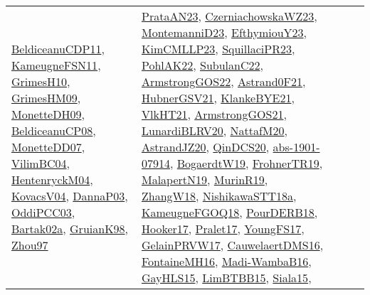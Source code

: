 {\begin{longtable}{lp{3cm}>{\raggedright}p{6cm}>{\raggedright}p{6cm}p{8cm}}
\href{articles/BeldiceanuCDP11.pdf}{BeldiceanuCDP11}\cite{BeldiceanuCDP11}, \href{papers/KameugneFSN11.pdf}{KameugneFSN11}\cite{KameugneFSN11}, \href{papers/GrimesH10.pdf}{GrimesH10}\cite{GrimesH10}, \href{papers/GrimesHM09.pdf}{GrimesHM09}\cite{GrimesHM09}, \href{papers/MonetteDH09.pdf}{MonetteDH09}\cite{MonetteDH09}, \href{papers/BeldiceanuCP08.pdf}{BeldiceanuCP08}\cite{BeldiceanuCP08}, \href{papers/MonetteDD07.pdf}{MonetteDD07}\cite{MonetteDD07}, \href{papers/VilimBC04.pdf}{VilimBC04}\cite{VilimBC04}, \href{papers/HentenryckM04.pdf}{HentenryckM04}\cite{HentenryckM04}, \href{papers/KovacsV04.pdf}{KovacsV04}\cite{KovacsV04}, \href{papers/DannaP03.pdf}{DannaP03}\cite{DannaP03}, \href{papers/OddiPCC03.pdf}{OddiPCC03}\cite{OddiPCC03}, \href{papers/Bartak02a.pdf}{Bartak02a}\cite{Bartak02a}, \href{papers/GruianK98.pdf}{GruianK98}\cite{GruianK98}, \href{articles/Zhou97.pdf}{Zhou97}\cite{Zhou97} & \href{articles/PrataAN23.pdf}{PrataAN23}\cite{PrataAN23}, \href{articles/CzerniachowskaWZ23.pdf}{CzerniachowskaWZ23}\cite{CzerniachowskaWZ23}, \href{articles/MontemanniD23.pdf}{MontemanniD23}\cite{MontemanniD23}, \href{papers/EfthymiouY23.pdf}{EfthymiouY23}\cite{EfthymiouY23}, \href{papers/KimCMLLP23.pdf}{KimCMLLP23}\cite{KimCMLLP23}, \href{papers/SquillaciPR23.pdf}{SquillaciPR23}\cite{SquillaciPR23}, \href{articles/PohlAK22.pdf}{PohlAK22}\cite{PohlAK22}, \href{articles/SubulanC22.pdf}{SubulanC22}\cite{SubulanC22}, \href{papers/ArmstrongGOS22.pdf}{ArmstrongGOS22}\cite{ArmstrongGOS22}, \href{papers/Astrand0F21.pdf}{Astrand0F21}\cite{Astrand0F21}, \href{articles/HubnerGSV21.pdf}{HubnerGSV21}\cite{HubnerGSV21}, \href{papers/KlankeBYE21.pdf}{KlankeBYE21}\cite{KlankeBYE21}, \href{articles/VlkHT21.pdf}{VlkHT21}\cite{VlkHT21}, \href{papers/ArmstrongGOS21.pdf}{ArmstrongGOS21}\cite{ArmstrongGOS21}, \href{articles/LunardiBLRV20.pdf}{LunardiBLRV20}\cite{LunardiBLRV20}, \href{papers/NattafM20.pdf}{NattafM20}\cite{NattafM20}, \href{articles/AstrandJZ20.pdf}{AstrandJZ20}\cite{AstrandJZ20}, \href{articles/QinDCS20.pdf}{QinDCS20}\cite{QinDCS20}, \href{articles/abs-1901-07914.pdf}{abs-1901-07914}\cite{abs-1901-07914}, \href{papers/BogaerdtW19.pdf}{BogaerdtW19}\cite{BogaerdtW19}, \href{papers/FrohnerTR19.pdf}{FrohnerTR19}\cite{FrohnerTR19}, \href{papers/MalapertN19.pdf}{MalapertN19}\cite{MalapertN19}, \href{papers/MurinR19.pdf}{MurinR19}\cite{MurinR19}, \href{articles/ZhangW18.pdf}{ZhangW18}\cite{ZhangW18}, \href{papers/NishikawaSTT18a.pdf}{NishikawaSTT18a}\cite{NishikawaSTT18a}, \href{papers/KameugneFGOQ18.pdf}{KameugneFGOQ18}\cite{KameugneFGOQ18}, \href{articles/PourDERB18.pdf}{PourDERB18}\cite{PourDERB18}, \href{papers/Hooker17.pdf}{Hooker17}\cite{Hooker17}, \href{papers/Pralet17.pdf}{Pralet17}\cite{Pralet17}, \href{papers/YoungFS17.pdf}{YoungFS17}\cite{YoungFS17}, \href{papers/GelainPRVW17.pdf}{GelainPRVW17}\cite{GelainPRVW17}, \href{papers/CauwelaertDMS16.pdf}{CauwelaertDMS16}\cite{CauwelaertDMS16}, \href{papers/FontaineMH16.pdf}{FontaineMH16}\cite{FontaineMH16}, \href{papers/Madi-WambaB16.pdf}{Madi-WambaB16}\cite{Madi-WambaB16}, \href{papers/GayHLS15.pdf}{GayHLS15}\cite{GayHLS15}, \href{papers/LimBTBB15.pdf}{LimBTBB15}\cite{LimBTBB15}, \href{articles/Siala15.pdf}{Siala15}\cite{Siala15}, 
\end{longtable}}
